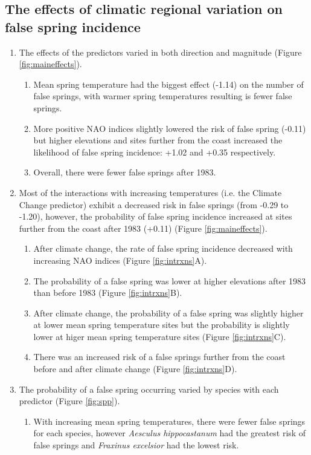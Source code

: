\documentclass{article}\usepackage[]{graphicx}\usepackage[]{color}
\begin{document}
\subsection*{The effects of climatic regional variation on false spring incidence}
\begin{enumerate}
\item The effects of the predictors varied in both direction and magnitude (Figure \ref{fig:maineffects}).
  \begin{enumerate}
  \item Mean spring temperature had the biggest effect (-1.14) on the number of false springs, with warmer spring temperatures resulting is fewer false springs. 
  \item More positive NAO indices slightly lowered the risk of false spring (-0.11) but higher elevations and sites further from the coast increased the likelihood of false spring incidence: +1.02 and +0.35 respectively.
  \item Overall, there were fewer false springs after 1983. 
  \end{enumerate}
\item Most of the interactions with increasing temperatures (i.e. the Climate Change predictor) exhibit a decreased risk in false springs (from -0.29 to -1.20), however, the probability of false spring incidence increased at sites further from the coast after 1983 (+0.11) (Figure \ref{fig:maineffects}). 
  \begin{enumerate}
  \item After climate change, the rate of false spring incidence decreased with increasing NAO indices (Figure \ref{fig:intrxns}A).
  \item The probability of a false spring was lower at higher elevations after 1983 than before 1983 (Figure \ref{fig:intrxns}B).
  \item After climate change, the probability of a false spring was slightly higher at lower mean spring temperature sites but the probability is slightly lower at higer mean spring temperature sites (Figure \ref{fig:intrxns}C).
  \item There was an increased risk of a false springs further from the coast before and after climate change (Figure \ref{fig:intrxns}D).
  \end{enumerate}
\item The probability of a false spring occurring varied by species with each predictor (Figure \ref{fig:spp}).
  \begin{enumerate}
  \item With increasing mean spring temperatures, there were fewer false springs for each species, however \textit{Aesculus hippocastanum} had the greatest risk of false springs and \textit{Fraxinus excelsior} had the lowest risk. 

\end{enumerate}
\end{enumerate}
\end{document}
